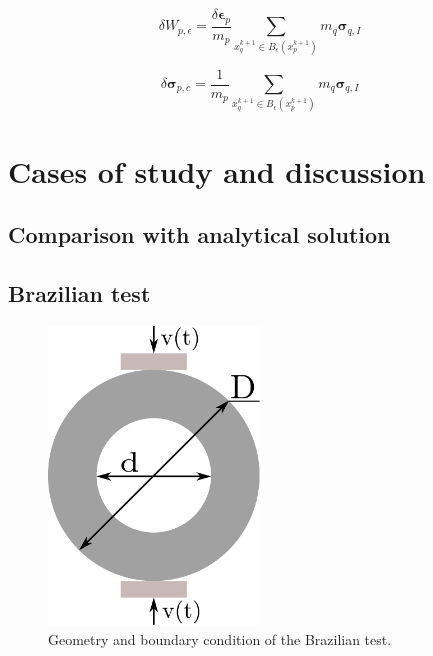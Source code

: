 \documentclass[preprint,12pt,a4paper]{elsarticle}
\newcommand{\tens}[1]{
  \ensuremath{\mathbf{{#1}}}
}
\begin{document}
\begin{equation}
  \label{eq:variation-averaged-strain-energy-density-simpli}
  \delta W_{p,\epsilon} =
  \frac{\delta \tens{\epsilon}_p}{m_p} \sum_{x_q^{k+1} \in
  B_{\epsilon}(x_p^{k+1})} m_q \tens{\sigma}_{q,I} 
\end{equation}

\begin{equation}
  \label{eq:equivalent-critical-stress}
  \delta \tens{\sigma}_{p,c} =
  \frac{1}{m_p} \sum_{x_q^{k+1} \in
  B_{\epsilon}(x_p^{k+1})} m_q \tens{\sigma}_{q,I} 
\end{equation}

\section{Cases of study and discussion}
\label{sec:3}

\subsection{Comparison with analytical solution}
\label{sec:3.1}

\subsection{Brazilian test}
\label{sec:3.2}

\begin{figure}
  \centering
  \includegraphics[width=0.5\textwidth]{Figures/Brazilian}
  \caption{Geometry and boundary condition of the Brazilian test.}
  \label{fig:geometry-brazilian-test}
\end{figure}
\end{document}
